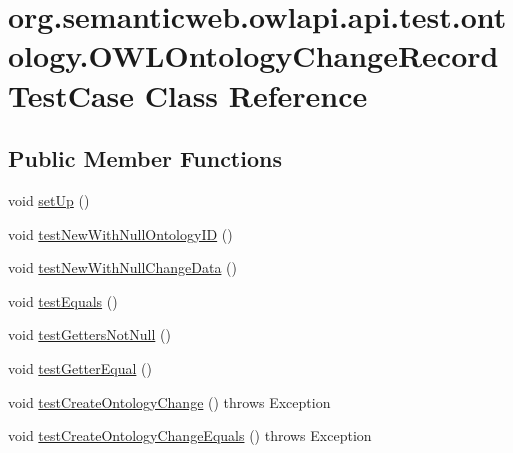 \hypertarget{classorg_1_1semanticweb_1_1owlapi_1_1api_1_1test_1_1ontology_1_1_o_w_l_ontology_change_record_test_case}{\section{org.\-semanticweb.\-owlapi.\-api.\-test.\-ontology.\-O\-W\-L\-Ontology\-Change\-Record\-Test\-Case Class Reference}
\label{classorg_1_1semanticweb_1_1owlapi_1_1api_1_1test_1_1ontology_1_1_o_w_l_ontology_change_record_test_case}
}
\subsection*{Public Member Functions}
\begin{DoxyCompactItemize}
\item 
void \hyperlink{classorg_1_1semanticweb_1_1owlapi_1_1api_1_1test_1_1ontology_1_1_o_w_l_ontology_change_record_test_case_a10f4f5260f56455534fada361771b625}{set\-Up} ()
\item 
void \hyperlink{classorg_1_1semanticweb_1_1owlapi_1_1api_1_1test_1_1ontology_1_1_o_w_l_ontology_change_record_test_case_a4695bd336b652a8dfa767f1649cc7ff1}{test\-New\-With\-Null\-Ontology\-I\-D} ()
\item 
void \hyperlink{classorg_1_1semanticweb_1_1owlapi_1_1api_1_1test_1_1ontology_1_1_o_w_l_ontology_change_record_test_case_ab1453784f0720010f57197a3c5254452}{test\-New\-With\-Null\-Change\-Data} ()
\item 
void \hyperlink{classorg_1_1semanticweb_1_1owlapi_1_1api_1_1test_1_1ontology_1_1_o_w_l_ontology_change_record_test_case_a526794be6f31e45627253c444209644d}{test\-Equals} ()
\item 
void \hyperlink{classorg_1_1semanticweb_1_1owlapi_1_1api_1_1test_1_1ontology_1_1_o_w_l_ontology_change_record_test_case_a175e032de2eaae0960c8929d631f64eb}{test\-Getters\-Not\-Null} ()
\item 
void \hyperlink{classorg_1_1semanticweb_1_1owlapi_1_1api_1_1test_1_1ontology_1_1_o_w_l_ontology_change_record_test_case_a060235d9487bb053527d66e006c2e757}{test\-Getter\-Equal} ()
\item 
void \hyperlink{classorg_1_1semanticweb_1_1owlapi_1_1api_1_1test_1_1ontology_1_1_o_w_l_ontology_change_record_test_case_a41c392c920e4bfaa7259c734d6e079c7}{test\-Create\-Ontology\-Change} ()  throws Exception 
\item 
void \hyperlink{classorg_1_1semanticweb_1_1owlapi_1_1api_1_1test_1_1ontology_1_1_o_w_l_ontology_change_record_test_case_a03fcbceb7a4529c2051be46ed9f880f6}{test\-Create\-Ontology\-Change\-Equals} ()  throws Exception 
\end{DoxyCompactItemize}

